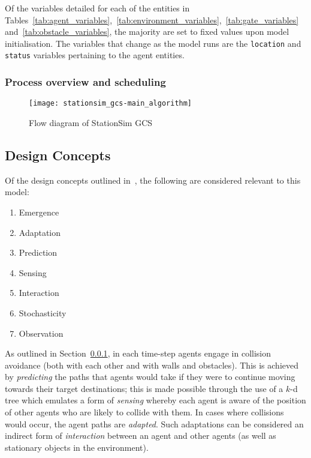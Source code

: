 Of the variables detailed for each of the entities in
Tables~\ref{tab:agent_variables},~\ref{tab:environment_variables},~\ref{tab:gate_variables}
and~\ref{tab:obstacle_variables}, the majority are set
to fixed values upon model initialisation.
The variables that change as the model runs are the \texttt{location} and
\texttt{status} variables pertaining to the agent entities.

\subsubsection{Process overview and
scheduling}\label{subs:stationsim:overview:process}

\begin{figure}[h]
    \centering
    \texttt{[image: stationsim\_gcs-main\_algorithm]}
    \caption{Flow diagram of StationSim GCS}
    \label{fig:flow:stationsim}
\end{figure}

\subsection{Design Concepts}\label{sub:stationsim:design_concepts}

Of the design concepts outlined in~\cite{grimm2010odd}, the following are
considered relevant to this model:
\begin{enumerate}
    \item Emergence
    \item Adaptation
    \item Prediction
    \item Sensing
    \item Interaction
    \item Stochasticity
    \item Observation
\end{enumerate}

As outlined in Section~\ref{subs:stationsim:overview:process}, in each time-step
agents engage in collision avoidance (both with each other and with walls and
obstacles).
This is achieved by \emph{predicting} the paths that agents would take if they
were to continue moving towards their target destinations; this is made possible
through the use of a $k$-d tree which emulates a form of \emph{sensing} whereby
each agent is aware of the position of other agents who are likely to collide
with them.
In cases where collisions would occur, the agent paths are \emph{adapted}.
Such adaptations can be considered an indirect form of \emph{interaction}
between an agent and other agents (as well as stationary objects in the
environment).

